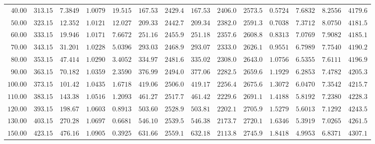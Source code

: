 \documentclass[10pt,twoside,openany,letterpaper]{book}
\begin{document}
\begin{quicksheet}
\begin{formulacard}
\begin{tabularx}{\linewidth}{@{}r r r r r r r r r r r r r r@{}}
$40.00$ & $313.15$ & $7.3849$ & $1.0079$ & $19.515$ & $167.53$ & $2429.4$ & $167.53$ & $2406.0$ & $2573.5$ & $0.5724$ & $7.6832$ & $8.2556$ & $4179.6$ \\
$50.00$ & $323.15$ & $12.352$ & $1.0121$ & $12.027$ & $209.33$ & $2442.7$ & $209.34$ & $2382.0$ & $2591.3$ & $0.7038$ & $7.3712$ & $8.0750$ & $4181.5$ \\
$60.00$ & $333.15$ & $19.946$ & $1.0171$ & $7.6672$ & $251.16$ & $2455.9$ & $251.18$ & $2357.6$ & $2608.8$ & $0.8313$ & $7.0769$ & $7.9082$ & $4185.1$ \\
$70.00$ & $343.15$ & $31.201$ & $1.0228$ & $5.0396$ & $293.03$ & $2468.9$ & $293.07$ & $2333.0$ & $2626.1$ & $0.9551$ & $6.7989$ & $7.7540$ & $4190.2$ \\
$80.00$ & $353.15$ & $47.414$ & $1.0290$ & $3.4052$ & $334.97$ & $2481.6$ & $335.02$ & $2308.0$ & $2643.0$ & $1.0756$ & $6.5355$ & $7.6111$ & $4196.9$ \\
$90.00$ & $363.15$ & $70.182$ & $1.0359$ & $2.3590$ & $376.99$ & $2494.0$ & $377.06$ & $2282.5$ & $2659.6$ & $1.1929$ & $6.2853$ & $7.4782$ & $4205.3$ \\
$100.00$ & $373.15$ & $101.42$ & $1.0435$ & $1.6718$ & $419.06$ & $2506.0$ & $419.17$ & $2256.4$ & $2675.6$ & $1.3072$ & $6.0470$ & $7.3542$ & $4215.7$ \\
$110.00$ & $383.15$ & $143.38$ & $1.0516$ & $1.2093$ & $461.27$ & $2517.7$ & $461.42$ & $2229.6$ & $2691.1$ & $1.4188$ & $5.8192$ & $7.2380$ & $4228.3$ \\
$120.00$ & $393.15$ & $198.67$ & $1.0603$ & $0.8913$ & $503.60$ & $2528.9$ & $503.81$ & $2202.1$ & $2705.9$ & $1.5279$ & $5.6013$ & $7.1292$ & $4243.5$ \\
$130.00$ & $403.15$ & $270.28$ & $1.0697$ & $0.6681$ & $546.10$ & $2539.5$ & $546.38$ & $2173.7$ & $2720.1$ & $1.6346$ & $5.3919$ & $7.0265$ & $4261.5$ \\
$150.00$ & $423.15$ & $476.16$ & $1.0905$ & $0.3925$ & $631.66$ & $2559.1$ & $632.18$ & $2113.8$ & $2745.9$ & $1.8418$ & $4.9953$ & $6.8371$ & $4307.1$ \\
\bottomrule
\end{tabularx}
\end{formulacard}
\end{quicksheet}
\end{document}
